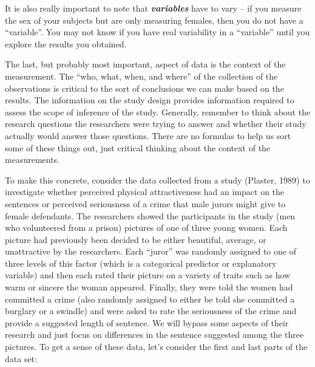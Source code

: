 \documentclass[]{book}
\begin{document}
It is also really important to note that \textbf{\emph{variables}} have
to vary -- if you measure the sex of your subjects but are only
measuring females, then you do not have a ``variable''. You may not know
if you have real variability in a ``variable'' until you explore the
results you obtained.

The last, but probably most important, aspect of data is the context of
the measurement. The ``who, what, when, and where'' of the collection of
the observations is critical to the sort of conclusions we can make
based on the results. The information on the study design provides
information required to assess the scope of inference of the study.
Generally, remember to think about the research questions the
researchers were trying to answer and whether their study actually would
answer those questions. There are no formulas to help us sort some of
these things out, just critical thinking about the context of the
measurements.

To make this concrete, consider the data collected from a study
(Plaster, 1989) to investigate whether perceived physical attractiveness
had an impact on the sentences or perceived seriousness of a crime that
male jurors might give to female defendants. The researchers showed the
participants in the study (men who volunteered from a prison) pictures
of one of three young women. Each picture had previously been decided to
be either beautiful, average, or unattractive by the researchers. Each
``juror'' was randomly assigned to one of three levels of this factor
(which is a categorical predictor or explanatory variable) and then each
rated their picture on a variety of traits such as how warm or sincere
the woman appeared. Finally, they were told the women had committed a
crime (also randomly assigned to either be told she committed a burglary
or a swindle) and were asked to rate the seriousness of the crime and
provide a suggested length of sentence. We will bypass some aspects of
their research and just focus on differences in the sentence suggested
among the three pictures. To get a sense of these data, let's consider
the first and last parts of the data set:
\end{document}
